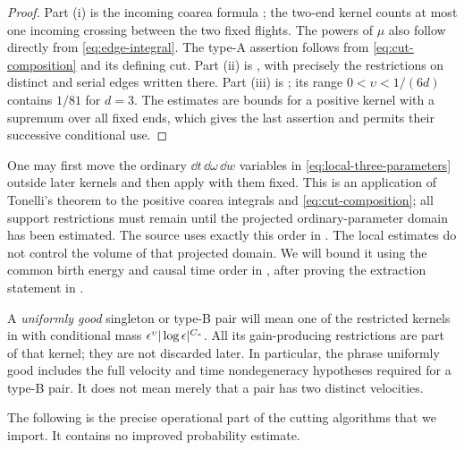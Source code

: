 \begin{proof}
Part (i) is the incoming coarea formula
\cite[Proposition 9.1, Equations (9.1)--(9.6)]{DHM2025}; the two-end
kernel counts at most one incoming crossing between the two fixed
flights. The powers of \(\mu\) also follow directly from
\eqref{eq:edge-integral}. The type-A assertion follows from
\eqref{eq:cut-composition} and its defining cut. Part (ii) is
\cite[Proposition 9.2(1), Equations (9.14)--(9.15)]{DHM2025}, with
precisely the restrictions on distinct and serial edges written there.
Part (iii) is \cite[Proposition 9.3(2), Equation (9.23)]{DHM2025};
its range \(0<\upsilon<1/(6d)\) contains \(1/81\) for \(d=3\).
The estimates are bounds for a positive kernel with a supremum over
all fixed ends, which gives the last assertion and permits their
successive conditional use.
\end{proof}

\begin{remark}\label{rem:conditional-extraction}
One may first move the ordinary \(\dd t\,\dd\omega\,\dd w\)
variables in \eqref{eq:local-three-parameters} outside later kernels
and then apply  with them fixed. This is an
application of Tonelli's theorem to the positive coarea integrals and
\eqref{eq:cut-composition}; all support restrictions must remain until
the projected ordinary-parameter domain has been estimated. The source
uses exactly this order in \cite[Equations (9.66) and (9.74)]{DHM2025}.
The local estimates do not control the volume of that projected
domain. We will bound it using the common birth energy and causal
time order in , after proving
the extraction statement in .
\end{remark}

A \emph{uniformly good} singleton or type-B pair will mean one of the
restricted kernels in  with conditional mass
\(\epsilon^\upsilon|\log\epsilon|^{C_*}\).  All its gain-producing restrictions
are part of that kernel; they are not discarded later.
In particular, the phrase uniformly good includes the full velocity
and time nondegeneracy hypotheses required for a type-B pair.  It
does not mean merely that a pair has two distinct velocities.

The following is the precise operational part of the cutting
algorithms that we import.  It contains no improved probability
estimate.

